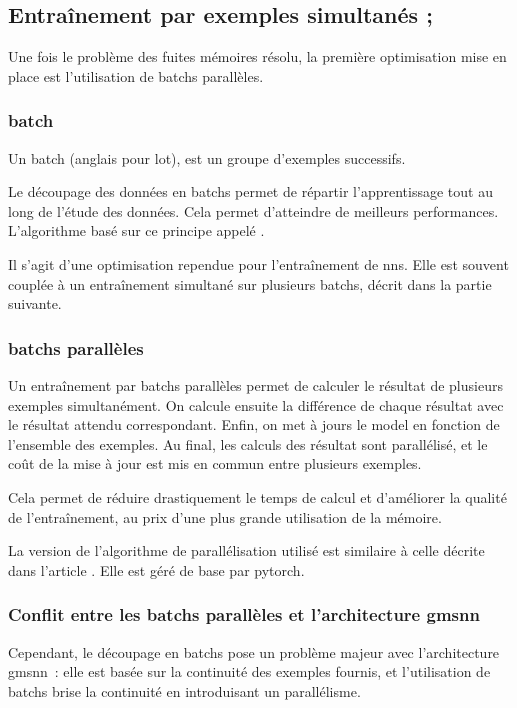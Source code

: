 \subsection{Entraînement par exemples simultanés ; } \label{subsec:optibatch}
Une fois le problème des fuites mémoires résolu, la première optimisation mise en place est l'utilisation de \glspl{batch} parallèles.

\subsubsection{\gls{batch}}
Un \gls{batch} (anglais pour lot), est un groupe d'exemples successifs.

Le découpage des données en \glspl{batch} permet de répartir l'apprentissage tout au long de l'étude des données.
Cela permet d'atteindre de meilleurs performances.
L'algorithme basé sur ce principe appelé \autocite{batch}.

Il s'agit d'une optimisation rependue pour l'entraînement de \glspl{nn}\autocite{batch}.
Elle est souvent couplée à un entraînement simultané sur plusieurs \glspl{batch}, décrit dans la partie suivante.

\subsubsection{\Glspl{batch} parallèles}
Un entraînement par \glspl{batch} parallèles permet de calculer le résultat de plusieurs exemples simultanément.
On calcule ensuite la différence de chaque résultat avec le résultat attendu correspondant.
Enfin, on met à jours le \gls{model} en fonction de l'ensemble des exemples.
Au final, les calculs des résultat sont parallélisé, et le coût de la mise à jour est mis en commun entre plusieurs exemples.

Cela permet de réduire drastiquement le temps de calcul et d'améliorer la qualité de l'entraînement, au prix d'une plus grande utilisation de la mémoire.

La version de l'algorithme de parallélisation utilisé est similaire à celle décrite dans l'article \autocite{batch_parallel}. Elle est géré de base par \gls{pytorch}.

\subsubsection{Conflit entre les \glspl{batch} parallèles et l'architecture \gls{gmsnn}}
Cependant, le découpage en \glspl{batch} pose un problème majeur avec l'architecture \gls{gmsnn}~: elle est basée sur la continuité des exemples fournis, et l'utilisation de \glspl{batch} brise la continuité en introduisant un parallélisme.

